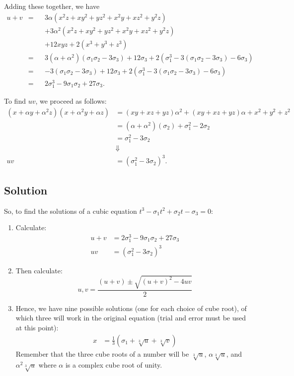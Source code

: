 \documentclass[a4paper,10pt,titlepage]{article}
\theoremstyle{definition}
\begin{document}
Adding these together, we have
\begin{align*}
  u + v &= &&  3\alpha(x^2z + xy^2 + yz^2 + x^2y + xz^2 + y^2z)\\
        &  &&+ 3\alpha^2(x^2z + xy^2 + yz^2 + x^2y + xz^2 + y^2z)\\
        &  &&+ 12xyz + 2(x^3 + y^3 + z^3)\\
        &= &&3(\alpha + \alpha^2)(\sigma_1\sigma_2 - 3\sigma_3) + 12\sigma_3 + 2(\sigma_1^3 - 3(\sigma_1\sigma_2 - 3\sigma_3) - 6\sigma_3)\\
        &= &&-3(\sigma_1\sigma_2 - 3\sigma_3) + 12\sigma_3 + 2(\sigma_1^3 - 3(\sigma_1\sigma_2 - 3\sigma_3) - 6\sigma_3)\\
        &= &&2\sigma_1^3 - 9\sigma_1\sigma_2 + 27\sigma_3.
\end{align*}

To find $ uv $, we proceed as follows:
\begin{align*}
  (x + \alpha y + \alpha^2 z)(x + \alpha^2 y + \alpha z) &= (xy + xz + yz)\alpha^2 + (xy + xz + yz)\alpha + x^2 + y^2 + z^2\\
                                                         &= (\alpha + \alpha^2)(\sigma_2) + \sigma_1^2 - 2\sigma_2\\
                                                         &= \sigma_1^2 - 3\sigma_2\\
                                                         &\Downarrow\\
                                                      uv &= (\sigma_1^2 - 3\sigma_2)^3.
\end{align*}

\subsection*{Solution}
So, to find the solutions of a cubic equation $ t^3 - \sigma_1 t^2 + \sigma_2 t - \sigma_3 = 0 $:
\begin{enumerate}
  \item Calculate:
    \begin{align*}
      u + v &= 2\sigma_1^3 - 9\sigma_1\sigma_2 + 27\sigma_3\\
      uv    &= (\sigma_1^2 - 3\sigma_2)^3
    \end{align*}
  \item Then calculate:
    \begin{displaymath}
      u,v = \frac{(u+v) \pm \sqrt{(u  + v)^2 - 4uv}}{2}
    \end{displaymath}
  \item Hence, we have nine possible solutions (one for each choice of cube root), of
        which three will work in the original equation (trial and error must be used at this point):
    \begin{align*}
      x &= \frac{1}{3}\left( \sigma_1 + \sqrt[3]{u} + \sqrt[3]{v} \right)
    \end{align*}
    Remember that the three cube roots of a number will be $ \sqrt[3]{u} $, $ \alpha\sqrt[3]{u} $,
    and $ \alpha^2 \sqrt[3]{u} $ where $ \alpha $ is a complex cube root of unity.
\end{enumerate}
\end{document}
